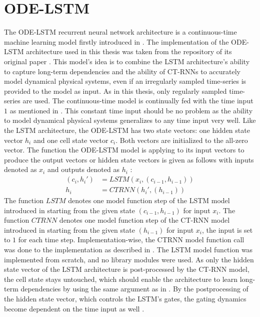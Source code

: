 \documentclass[draft,final]{vutinfth} %
\begin{document}
    \section{ODE-LSTM} \label{odelstm}
    The ODE-LSTM recurrent neural network architecture is a continuous-time machine learning model firstly introduced in \cite{ODELSTM}.
    The implementation of the ODE-LSTM architecture used in this thesis was taken from the repository of its original paper \cite{ODELSTM}.
    This model's idea is to combine the LSTM architecture's ability to capture long-term dependencies and the ability of CT-RNNs to accurately model dynamical physical systems, even if an irregularly sampled time-series is provided to the model as input.
    As in this thesis, only regularly sampled time-series are used. The continuous-time model is continually fed with the time input $1$ as mentioned in .
    This constant time input should be no problem as the ability to model dynamical physical systems generalizes to any time input very well.
    Like the LSTM architecture, the ODE-LSTM has two state vectors: one hidden state vector $h_i$ and one cell state vector $c_i$. Both vectors are initialized to the all-zero vector.
    The function the ODE-LSTM model is applying to its input vectors to produce the output vectors or hidden state vectors is given as follows with inputs denoted as $x_i$ and outputs denoted as $h_i$ \cite[p. 5]{ODELSTM}:
    \begin{align}
    (c_i,h_i')
        &= LSTM(x_i, (c_{i-1}, h_{i-1})) \\
        h_i &= CTRNN(h_i', (h_{i-1}))
    \end{align}
    The function $LSTM$ denotes one model function step of the LSTM model introduced in  starting from the given state $(c_{i-1}, h_{i-1})$ for input $x_i$.
    The function $CTRNN$ denotes one model function step of the CT-RNN model introduced in  starting from the given state $(h_{i-1})$ for input $x_i$, the input is set to $1$ for each time step.
    Implementation-wise, the CTRNN model function call was done to the implementation as described in .
    The LSTM model function was implemented from scratch, and no library modules were used.
    As only the hidden state vector of the LSTM architecture is post-processed by the CT-RNN model, the cell state stays untouched, which should enable the architecture to learn long-term dependencies by using the same argument as in .
    By the postprocessing of the hidden state vector, which controls the LSTM's gates, the gating dynamics become dependent on the time input as well \cite[p. 4]{ODELSTM}.
\end{document}
